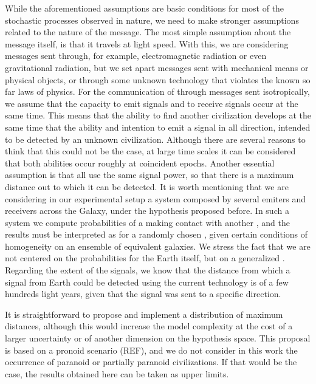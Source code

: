 While the aforementioned assumptions are basic conditions for most of
the stochastic processes observed in nature, we need to make stronger
assumptions related to the nature of the message.
%
The most simple assumption about the message itself, is that it
travels at light speed.
%
With this, we are considering messages sent through, for example,
electromagnetic radiation or even gravitational radiation, but we set
apart messages sent with mechanical means or physical objects, or
through some unknown technology that violates the known so far laws of
physics.
% 
For the communication of \cetis through messages sent isotropically, we
assume that the capacity to emit signals and to receive signals occur
at the same time.
%
This means that the ability to find another civilization develops at
the same time that the ability and intention to emit a signal in all
direction, intended to be detected by an unknown civilization.
%
Although there are several reasons to think that this could not be the
case, at large time scales it can be considered that both abilities
occur roughly at coincident epochs.
%
Another essential assumption is that all \cetis use the same signal
power, so that there is a maximum distance out to which it can be
detected.
%
It is worth mentioning that we are considering in our experimental
setup a system composed by several emiters and receivers across the
Galaxy, under the hypothesis proposed before.
%
In such a system we compute probabilities of a \ceti making contact
with another \ceti, and the results must be interpreted as for a
randomly chosen \ceti, given certain conditions of homogeneity on an
ensemble of equivalent galaxies.
%
We stress the fact that we are not centered on the probabilities for
the Earth itself, but on a generalized \ceti.
%
Regarding the extent of the signals, we know that the distance from
which a signal from Earth could be detected using the current
technology is of a few hundreds light years, given that the signal was
sent to a specific direction.

               

%
It is straightforward to propose and implement a distribution of
maximum distances, although this would increase the model complexity
at the cost of a larger uncertainty or of another dimension on the
hypothesis space.
%
This proposal is based on a pronoid scenario (REF), and we do not
consider in this work the occurrence of paranoid or partially paranoid
civilizations.
%
If that would be the case, the results obtained here can be taken as
upper limits.



